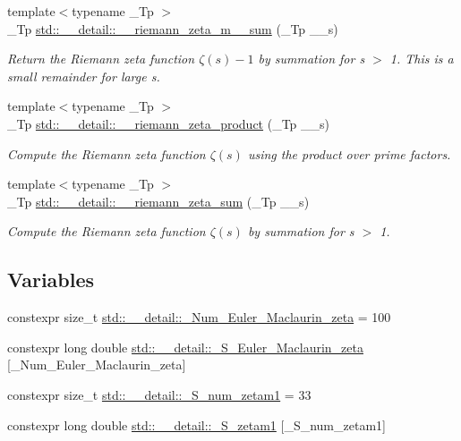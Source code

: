 \begin{DoxyCompactItemize}
{\footnotesize template$<$typename \+\_\+\+Tp $>$ }\\\+\_\+\+Tp \hyperlink{namespacestd_1_1____detail_a3985751e758b45d726ea8dec0450ca1e}{std\+::\+\_\+\+\_\+detail\+::\+\_\+\+\_\+riemann\+\_\+zeta\+\_\+m\+\_\+\_\+sum} (\+\_\+\+Tp \+\_\+\+\_\+s)
\begin{DoxyCompactList}\small\item\em Return the Riemann zeta function $ \zeta(s) - 1 $ by summation for s $>$ 1. This is a small remainder for large s. \end{DoxyCompactList}\item 
{\footnotesize template$<$typename \+\_\+\+Tp $>$ }\\\+\_\+\+Tp \hyperlink{namespacestd_1_1____detail_a917935f42a21af90b78a19ea81349129}{std\+::\+\_\+\+\_\+detail\+::\+\_\+\+\_\+riemann\+\_\+zeta\+\_\+product} (\+\_\+\+Tp \+\_\+\+\_\+s)
\begin{DoxyCompactList}\small\item\em Compute the Riemann zeta function $ \zeta(s) $ using the product over prime factors. \end{DoxyCompactList}\item 
{\footnotesize template$<$typename \+\_\+\+Tp $>$ }\\\+\_\+\+Tp \hyperlink{namespacestd_1_1____detail_a417dc216465f02bb7ef055fa0e4e1f0b}{std\+::\+\_\+\+\_\+detail\+::\+\_\+\+\_\+riemann\+\_\+zeta\+\_\+sum} (\+\_\+\+Tp \+\_\+\+\_\+s)
\begin{DoxyCompactList}\small\item\em Compute the Riemann zeta function $ \zeta(s) $ by summation for s $>$ 1. \end{DoxyCompactList}\end{DoxyCompactItemize}
\subsection*{Variables}
\begin{DoxyCompactItemize}
\item 
constexpr size\+\_\+t \hyperlink{namespacestd_1_1____detail_ab27e687e1052be7a72de187e0dead124}{std\+::\+\_\+\+\_\+detail\+::\+\_\+\+Num\+\_\+\+Euler\+\_\+\+Maclaurin\+\_\+zeta} = 100
\item 
constexpr long double \hyperlink{namespacestd_1_1____detail_acd941b49595dd03e93c88107ad2f68c2}{std\+::\+\_\+\+\_\+detail\+::\+\_\+\+S\+\_\+\+Euler\+\_\+\+Maclaurin\+\_\+zeta} \mbox{[}\+\_\+\+Num\+\_\+\+Euler\+\_\+\+Maclaurin\+\_\+zeta\mbox{]}
\item 
constexpr size\+\_\+t \hyperlink{namespacestd_1_1____detail_a807e36c2aec3a9f27fdb21726cd464e2}{std\+::\+\_\+\+\_\+detail\+::\+\_\+\+S\+\_\+num\+\_\+zetam1} = 33
\item 
constexpr long double \hyperlink{namespacestd_1_1____detail_a22ed80d9e5c3bc79e61a3cdb8e79a462}{std\+::\+\_\+\+\_\+detail\+::\+\_\+\+S\+\_\+zetam1} \mbox{[}\+\_\+\+S\+\_\+num\+\_\+zetam1\mbox{]}
\end{DoxyCompactItemize}


